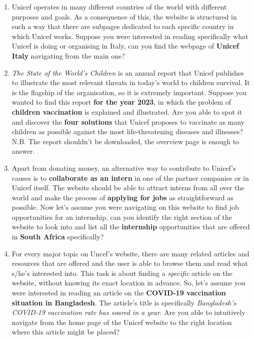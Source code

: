 \documentclass[11pt]{article}
\begin{document}
\begin{Form}
\begin{enumerate}
		\item Unicef operates in many different countries of the world with different purposes and goals. As a consequence of this, the website is structured in such a way that there are subpages dedicated to each specific country in which Unicef works. Suppose you were interested in reading specifically what Unicef is doing or organising in Italy, can you find the webpage of \textbf{Unicef Italy} navigating from the main one?
		
		\item \textit{The State of the World's Children} is an annual report that Unicef publishes to illustrate the most relevant threats in today's world to children survival. It is the flagship of the organisation, so it is extremely important. Suppose you wanted to find this report \textbf{for the year 2023}, in which the problem of \textbf{children vaccination} is explained and illustrated. Are you able to spot it and discover the \textbf{four solutions} that Unicef proposes to vaccinate as many children as possible against the most life-threatening diseases and illnesses?\\
		N.B. The report shouldn't be downloaded, the overview page is enough to answer.
		
		\item Apart from donating money, an alternative way to contribute to Unicef's causes is to \textbf{collaborate as an intern} in one of the partner companies or in Unicef itself. The website should be able to attract interns from all over the world and make the process of \textbf{applying for jobs} as straightforward as possible. Now let's assume you were navigating on this website to find job opportunities for an internship, can you identify the right section of the website to look into and list all the \textbf{internship} opportunities that are offered in \textbf{South Africa} specifically?
		
		\item For every major topic on Uncef's website, there are many related articles and resources that are offered and the user is able to browse them and read what s/he's interested into. This task is about finding a \textit{specific} article on the website, without knowing its exact location in advance. So, let's assume you were interested in reading an article on the\textbf{ COVID-19 vaccination situation in Bangladesh}. The article's title is specifically \textit{Bangladesh's COVID-19 vaccination rate has soared in a year}. Are you able to intuitively navigate from the home page of the Unicef website to the right location where this article might be placed?
		
		
	\end{enumerate}
			

	
	\end{Form}
	
\end{document}
